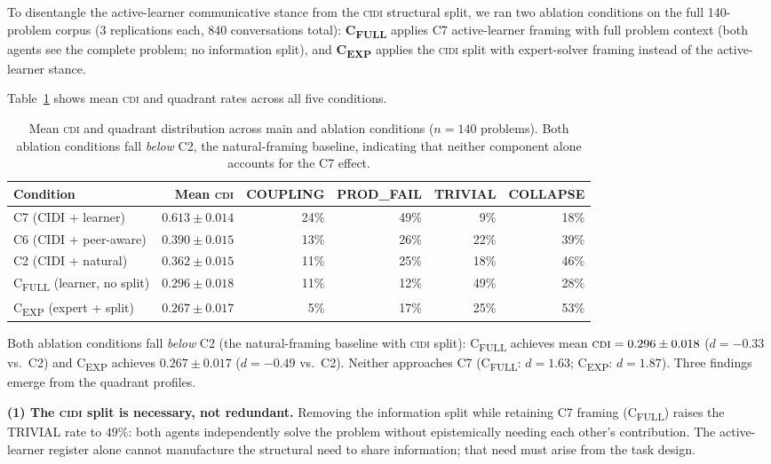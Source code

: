 \documentclass{article}
\newcommand{\CDI}{\textsc{cdi}}
\newcommand{\CIDI}{\textsc{cidi}}
\begin{document}
To disentangle the active-learner communicative stance from the \CIDI{}
structural split, we ran two ablation conditions on the full 140-problem
corpus (3 replications each, 840 conversations total):
\textbf{C\textsubscript{FULL}} applies C7 active-learner framing with
full problem context (both agents see the complete problem; no information
split), and \textbf{C\textsubscript{EXP}} applies the \CIDI{} split with
expert-solver framing instead of the active-learner stance.

Table~\ref{tab:ablations} shows mean \CDI{} and quadrant rates across
all five conditions.

\begin{table}[ht]
  \caption{Mean \CDI{} and quadrant distribution across main and ablation
  conditions ($n = 140$ problems). Both ablation conditions fall \emph{below}
  C2, the natural-framing baseline, indicating that neither component alone
  accounts for the C7 effect.}
  \label{tab:ablations}
  \centering
  \begin{tabular}{lrrrrr}
    \toprule
    \textbf{Condition} & \textbf{Mean \CDI{}} & \textbf{COUPLING} & \textbf{PROD\_FAIL} & \textbf{TRIVIAL} & \textbf{COLLAPSE} \\
    \midrule
    C7 (CIDI + learner)       & $0.613 \pm 0.014$ & 24\% & 49\% &  9\% & 18\% \\
    C6 (CIDI + peer-aware)    & $0.390 \pm 0.015$ & 13\% & 26\% & 22\% & 39\% \\
    C2 (CIDI + natural)       & $0.362 \pm 0.015$ & 11\% & 25\% & 18\% & 46\% \\
    \midrule
    C\textsubscript{FULL} (learner, no split) & $0.296 \pm 0.018$ & 11\% & 12\% & 49\% & 28\% \\
    C\textsubscript{EXP} (expert + split)     & $0.267 \pm 0.017$ &  5\% & 17\% & 25\% & 53\% \\
    \bottomrule
  \end{tabular}
\end{table}

Both ablation conditions fall \emph{below} C2 (the natural-framing
baseline with \CIDI{} split): C\textsubscript{FULL} achieves mean
$\CDI = 0.296 \pm 0.018$ ($d = -0.33$ vs.\ C2) and C\textsubscript{EXP}
achieves $0.267 \pm 0.017$ ($d = -0.49$ vs.\ C2). Neither approaches
C7 (C\textsubscript{FULL}: $d = 1.63$; C\textsubscript{EXP}: $d = 1.87$).
Three findings emerge from the quadrant profiles.

\textbf{(1) The \CIDI{} split is necessary, not redundant.} Removing
the information split while retaining C7 framing (C\textsubscript{FULL})
raises the TRIVIAL rate to $49\%$: both agents independently solve the
problem without epistemically needing each other's contribution. The
active-learner register alone cannot manufacture the structural need
to share information; that need must arise from the task design.
\end{document}
